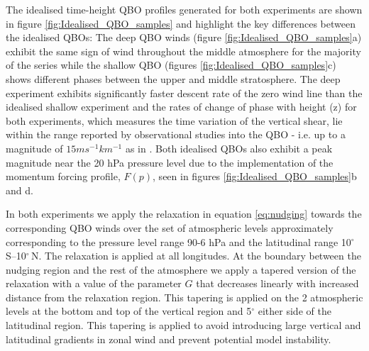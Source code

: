 The idealised time-height QBO profiles generated for both experiments are shown in figure \ref{fig:Idealised_QBO_samples} and highlight the key differences between the idealised QBOs: The deep QBO winds (figure \ref{fig:Idealised_QBO_samples}a) exhibit the same sign of wind throughout the middle atmosphere for the majority of the series while the shallow QBO (figures \ref{fig:Idealised_QBO_samples}c) shows different phases between the upper and middle stratosphere. The deep experiment exhibits significantly faster descent rate of the zero wind line than the idealised shallow experiment and the rates of change of phase with height (z) for both experiments, which measures the time variation of the vertical shear, lie within the range reported by observational studies into the QBO - i.e. up to a magnitude of $15ms^{-1}km^{-1}$ as in \cite{kinnersleyDescent1996}. Both idealised QBOs also exhibit a peak magnitude near the 20 hPa pressure level due to the implementation of the momentum forcing profile, $F(p)$, seen in figures \ref{fig:Idealised_QBO_samples}b and d. 

In both experiments we apply the relaxation in equation \ref{eq:nudging} towards the corresponding QBO winds over the set of atmospheric levels approximately corresponding to the pressure level range 90-6 hPa and the latitudinal range 10$^{\circ}$\,S--10$^{\circ}$\,N. The relaxation is applied at all longitudes. At the boundary between the nudging region and the rest of the atmosphere we apply a tapered version of the relaxation with a value of the parameter $G$ that decreases linearly with increased distance from the relaxation region. This tapering is applied on the 2 atmospheric levels at the bottom and top of the vertical region and 5$^\circ$ either side of the latitudinal region. This tapering is applied to avoid introducing large vertical and latitudinal gradients in zonal wind and prevent potential model instability. 

